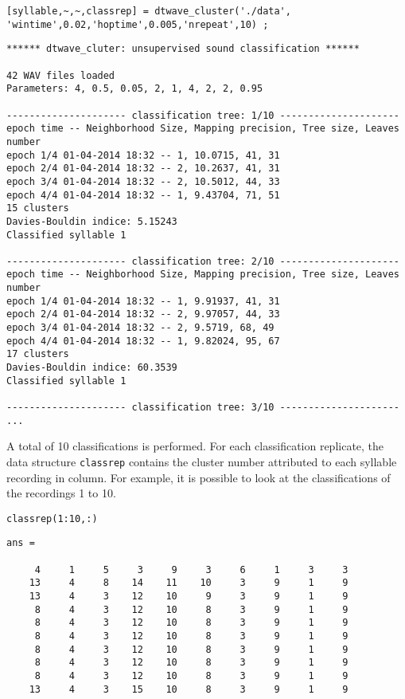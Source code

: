 \documentclass[a4paper]{article}
\begin{document}
\begin{verbatim}
[syllable,~,~,classrep] = dtwave_cluster('./data', 'wintime',0.02,'hoptime',0.005,'nrepeat',10) ;
\end{verbatim}

\color{lightgray}
\begin{verbatim}
****** dtwave_cluter: unsupervised sound classification ******

42 WAV files loaded
Parameters: 4, 0.5, 0.05, 2, 1, 4, 2, 2, 0.95

--------------------- classification tree: 1/10 ---------------------
epoch time -- Neighborhood Size, Mapping precision, Tree size, Leaves number
epoch 1/4 01-04-2014 18:32 -- 1, 10.0715, 41, 31
epoch 2/4 01-04-2014 18:32 -- 2, 10.2637, 41, 31
epoch 3/4 01-04-2014 18:32 -- 2, 10.5012, 44, 33
epoch 4/4 01-04-2014 18:32 -- 1, 9.43704, 71, 51
15 clusters
Davies-Bouldin indice: 5.15243
Classified syllable 1

--------------------- classification tree: 2/10 ---------------------
epoch time -- Neighborhood Size, Mapping precision, Tree size, Leaves number
epoch 1/4 01-04-2014 18:32 -- 1, 9.91937, 41, 31
epoch 2/4 01-04-2014 18:32 -- 2, 9.97057, 44, 33
epoch 3/4 01-04-2014 18:32 -- 2, 9.5719, 68, 49
epoch 4/4 01-04-2014 18:32 -- 1, 9.82024, 95, 67
17 clusters
Davies-Bouldin indice: 60.3539
Classified syllable 1

--------------------- classification tree: 3/10 ---------------------
...
\end{verbatim}
\color{black}

A total of 10 classifications is performed.
For each classification replicate, the data structure \texttt{classrep} contains the cluster number attributed to each syllable recording in column.
For example, it is possible to look at the classifications of the recordings 1 to 10. 

\begin{verbatim}
classrep(1:10,:)
\end{verbatim}

\color{lightgray}
\begin{verbatim}
ans =

     4     1     5     3     9     3     6     1     3     3
    13     4     8    14    11    10     3     9     1     9
    13     4     3    12    10     9     3     9     1     9
     8     4     3    12    10     8     3     9     1     9
     8     4     3    12    10     8     3     9     1     9
     8     4     3    12    10     8     3     9     1     9
     8     4     3    12    10     8     3     9     1     9
     8     4     3    12    10     8     3     9     1     9
     8     4     3    12    10     8     3     9     1     9
    13     4     3    15    10     8     3     9     1     9

\end{verbatim}
\color{black}
\end{document}
